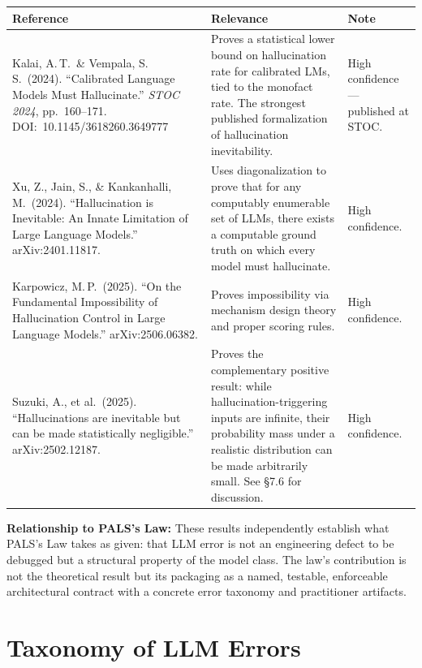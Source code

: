 \documentclass[11pt,a4paper]{article}
\begin{document}
\begin{longtable}{p{} p{} p{}}
\toprule
\textbf{Reference} & \textbf{Relevance} & \textbf{Note} \\
\midrule
\endhead
Kalai, A.\,T.\ \& Vempala, S.\,S.\ (2024). ``Calibrated Language Models Must Hallucinate.'' \emph{STOC 2024}, pp.\ 160--171. DOI:~10.1145/3618260.3649777 &
Proves a statistical lower bound on hallucination rate for calibrated LMs, tied to the monofact rate. The strongest published formalization of hallucination inevitability. &
High confidence --- published at STOC. \\
\midrule
Xu, Z., Jain, S., \& Kankanhalli, M.\ (2024). ``Hallucination is Inevitable: An Innate Limitation of Large Language Models.'' arXiv:2401.11817. &
Uses diagonalization to prove that for any computably enumerable set of LLMs, there exists a computable ground truth on which every model must hallucinate. &
High confidence. \\
\midrule
Karpowicz, M.\,P.\ (2025). ``On the Fundamental Impossibility of Hallucination Control in Large Language Models.'' arXiv:2506.06382. &
Proves impossibility via mechanism design theory and proper scoring rules. &
High confidence. \\
\midrule
Suzuki, A., et al.\ (2025). ``Hallucinations are inevitable but can be made statistically negligible.'' arXiv:2502.12187. &
Proves the complementary positive result: while hallucination-triggering inputs are infinite, their probability mass under a realistic distribution can be made arbitrarily small. See \S7.6 for discussion. &
High confidence. \\
\bottomrule
\end{longtable}

\begin{notebox}
\textbf{Relationship to PALS's Law:} These results independently establish what PALS's Law takes as given: that LLM error is not an engineering defect to be debugged but a structural property of the model class. The law's contribution is not the theoretical result but its packaging as a named, testable, enforceable architectural contract with a concrete error taxonomy and practitioner artifacts.
\end{notebox}

\section{Taxonomy of LLM Errors}
\end{document}

